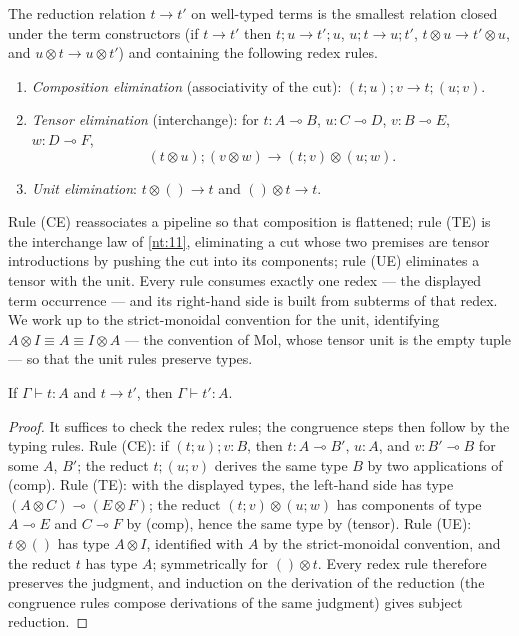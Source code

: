 \begin{definition}\label{def:lambda-op}
The reduction relation $t \longrightarrow t'$ on well-typed terms is the smallest relation closed under the term constructors (if $t \longrightarrow t'$ then $t ; u \longrightarrow t' ; u$, $u ; t \longrightarrow u ; t'$, $t \otimes u \longrightarrow t' \otimes u$, and $u \otimes t \longrightarrow u \otimes t'$) and containing the following redex rules.
\begin{enumerate}
\item[(CE)] \emph{Composition elimination} (associativity of the cut): $(t ; u) ; v \longrightarrow t ; (u ; v)$.
\item[(TE)] \emph{Tensor elimination} (interchange): for $t : A \multimap B$, $u : C \multimap D$, $v : B \multimap E$, $w : D \multimap F$,
\[
(t \otimes u) ; (v \otimes w) \longrightarrow (t ; v) \otimes (u ; w).
\]
\item[(UE)] \emph{Unit elimination}: $t \otimes () \longrightarrow t$ and $() \otimes t \longrightarrow t$.
\end{enumerate}
Rule (CE) reassociates a pipeline so that composition is flattened; rule (TE) is the interchange law of \autoref{nt:11}, eliminating a cut whose two premises are tensor introductions by pushing the cut into its components; rule (UE) eliminates a tensor with the unit. Every rule consumes exactly one redex --- the displayed term occurrence --- and its right-hand side is built from subterms of that redex. We work up to the strict-monoidal convention for the unit, identifying $A \otimes I \equiv A \equiv I \otimes A$ --- the convention of Mol, whose tensor unit is the empty tuple --- so that the unit rules preserve types.
\end{definition}

\begin{lemma}\label{lem:subject-reduction}
If $\Gamma \vdash t : A$ and $t \longrightarrow t'$, then $\Gamma \vdash t' : A$.
\end{lemma}

\begin{proof}
It suffices to check the redex rules; the congruence steps then follow by the typing rules. Rule (CE): if $(t ; u) ; v : B$, then $t : A \multimap B'$, $u : A$, and $v : B' \multimap B$ for some $A$, $B'$; the reduct $t ; (u ; v)$ derives the same type $B$ by two applications of (comp). Rule (TE): with the displayed types, the left-hand side has type $(A \otimes C) \multimap (E \otimes F)$; the reduct $(t ; v) \otimes (u ; w)$ has components of type $A \multimap E$ and $C \multimap F$ by (comp), hence the same type by (tensor). Rule (UE): $t \otimes ()$ has type $A \otimes I$, identified with $A$ by the strict-monoidal convention, and the reduct $t$ has type $A$; symmetrically for $() \otimes t$. Every redex rule therefore preserves the judgment, and induction on the derivation of the reduction (the congruence rules compose derivations of the same judgment) gives subject reduction.
\end{proof}

